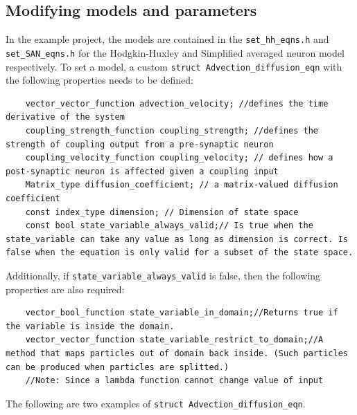 \documentclass[10pt]{article} %
\begin{document}
\subsection{Modifying models and parameters}
\label{str:Advdiffeqn}
In the example project, the models are contained in the \texttt{set\_hh\_eqns.h} and \texttt{set\_SAN\_eqns.h} for the Hodgkin-Huxley and Simplified averaged neuron model respectively. To set a model, a custom \texttt{struct Advection\_diffusion\_eqn} with the following properties needs to be defined:
\begin{lstlisting}
    vector_vector_function advection_velocity; //defines the time derivative of the system
    coupling_strength_function coupling_strength; //defines the strength of coupling output from a pre-synaptic neuron
    coupling_velocity_function coupling_velocity; // defines how a post-synaptic neuron is affected given a coupling input
    Matrix_type diffusion_coefficient; // a matrix-valued diffusion coefficient
    const index_type dimension; // Dimension of state space
    const bool state_variable_always_valid;// Is true when the state_variable can take any value as long as dimension is correct. Is false when the equation is only valid for a subset of the state space.
\end{lstlisting}
Additionally, if \texttt{state\_variable\_always\_valid} is false, then the following properties are also required:
\begin{lstlisting}
    vector_bool_function state_variable_in_domain;//Returns true if the variable is inside the domain.
    vector_vector_function state_variable_restrict_to_domain;//A method that maps particles out of domain back inside. (Such particles can be produced when particles are splitted.)
    //Note: Since a lambda function cannot change value of input
\end{lstlisting}
The following are two examples of \texttt{struct Advection\_diffusion\_eqn}.
\end{document}
